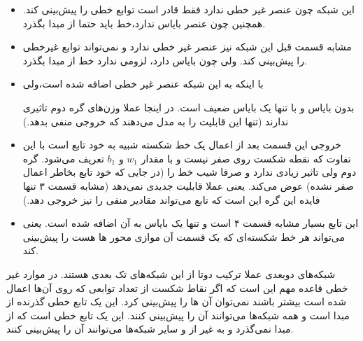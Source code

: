 \documentclass[a4paper,14pt]{extarticle}
\begin{document}
\begin{itemize}
	\item 
	\textbf{
	}
	این شبکه چون عنصر غیر خطی ندارد فقط قادر است توابع خطی را پیش‌بینی کند. همچنین چون عنصر بایاس ندارد،‌خط باید حتما از مبدا بگذرد.
	\item 
	\textbf{
		}
		مشابه قسمت قبل این شبکه نیز عنصر غیر خطی ندارد و نمی‌تواند توابع غیرخطی را پیش‌بینی کند. ولی چون بایاس دارد، لزومی ندارد خط از مبدا بگذرد.
		\item 
		\textbf{
			}
			با اینکه به این شبکه عنصر غیر خطی 
			اضافه شده است،‌ولی 
			
			بدون بایاس و با تنها یک بایاس ضعیف است. در اینجا عملا وزن‌های گره دوم تاثیری ندارند (تنها این قابلیت را به مدل می‌دهند که خروجی منفی بدهد.) 
			\item 
			\textbf{
				}
				خروجی این قسمت بعد از اعمال 
				یک خط شکسته شبیه به خود تابع 
				است با این تفاوت که نقطه شکست روی صفر نیست و با مقدار 
				$w_1$
				و
				$b_1$
				تعریف می‌شود. 
				گره دوم ولی تاثیر زیادی ندارد و صرفا شیب خط را (در جایی که خود تابع بخاطر اعمال  صفر نشده) عوض می‌کند. یعنی عملا قابلیت جدیدی نمی‌دهد (مشابه قسمت ۳ تنها فایده این گره این است که تابع می‌تواند مقادیر منفی را نیز خروجی دهد.)
				\item 
				\textbf{
					}
					این تابع بسیار مشابه قسمت ۴ است و تنها یک بایاس به آن اضافه شده است. یعنی می‌تواند هر خط شکسته‌ای که یک قسمت آن موازی محور 
					ها هست را پیش‌بینی کند.
		
\end{itemize}
شبکه‌های دوبعدی عملا ترکیب دوتا از این شبکه‌های تک بعدی هستند. در موارد غیر خطی قاعده مهم این است که اگر نقاط شکست از تعداد توابعی که 
روی آن‌ها اعمال شده است بیشتر باشند نمی‌توان آن ها را پیش‌بینی کرد.
این یک تابع خطی گذرنده از مبدا است و همه شبکه‌ها می‌توانند آن را پیش‌بینی کنند.
این یک تابع خطی است که از مبدا نمی‌گذرد و به غیر از 
و 
سایر شبکه‌ها می‌توانند آن را پیش‌بینی کنند.
\end{document}

